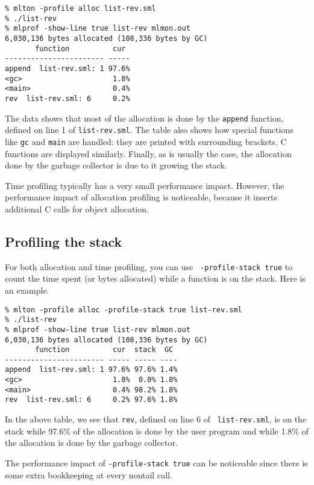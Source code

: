 \begin{verbatim}
% mlton -profile alloc list-rev.sml
% ./list-rev
% mlprof -show-line true list-rev mlmon.out
6,030,136 bytes allocated (108,336 bytes by GC)
       function          cur 
----------------------- -----
append  list-rev.sml: 1 97.6%
<gc>                     1.8%
<main>                   0.4%
rev  list-rev.sml: 6     0.2%
\end{verbatim}

The data shows that most of the allocation is done by the {\tt append}
function, defined on line 1 of {\tt list-rev.sml}.  The table also
shows how special functions like {\tt gc} and {\tt main} are handled:
they are printed with surrounding brackets.  C functions are displayed
similarly.  Finally, as is usually the case, the allocation done by
the garbage collector is due to it growing the stack.

Time profiling typically has a very small performance impact.
However, the performance impact of allocation profiling is noticeable,
because it inserts additional C calls for object allocation.

\subsection{Profiling the stack}

For both allocation and time profiling, you can use {\tt
-profile-stack true} to count the time spent (or bytes allocated)
while a function is on the stack.  Here is an example.

\begin{verbatim}
% mlton -profile alloc -profile-stack true list-rev.sml
% ./list-rev
% mlprof -show-line true list-rev mlmon.out
6,030,136 bytes allocated (108,336 bytes by GC)
       function          cur  stack  GC 
----------------------- ----- ----- ----
append  list-rev.sml: 1 97.6% 97.6% 1.4%
<gc>                     1.8%  0.0% 1.8%
<main>                   0.4% 98.2% 1.8%
rev  list-rev.sml: 6     0.2% 97.6% 1.8%
\end{verbatim}

In the above table, we see that {\tt rev}, defined on line 6 of {\tt
list-rev.sml}, is on the stack while 97.6\% of the allocation is done
by the user program and while 1.8\% of the allocation is done by the
garbage collector. 

The performance impact of {\tt -profile-stack true} can be noticeable
since there is some extra bookkeeping at every nontail call.


